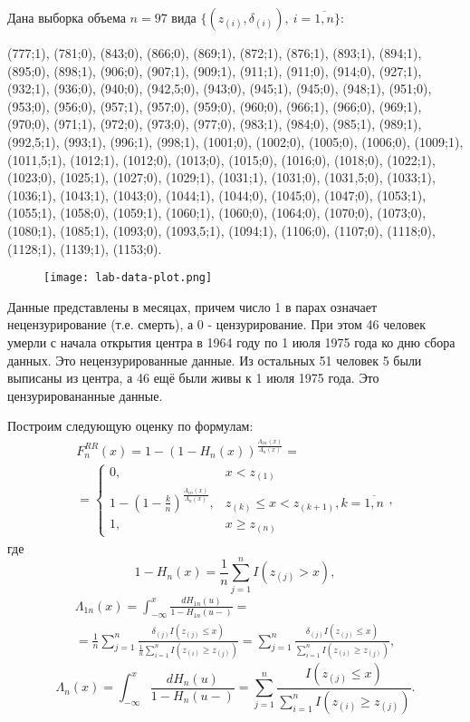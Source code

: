 Дана выборка объема $n = 97$ вида $\{(z_{(i)}, \delta_{(i)}),\ i=\overline{1,n}\}$:

(777;1), (781;0), (843;0), (866;0), (869;1), (872;1), (876;1), (893;1), (894;1), (895;0), (898;1), (906;0), (907;1), (909;1), (911;1), (911;0), (914;0), (927;1), (932;1), (936;0), (940;0), (942,5;0), (943;0), (945;1), (945;0), (948;1), (951;0), (953;0), (956;0), (957;1), (957;0), (959;0), (960;0), (966;1), (966;0), (969;1), (970;0), (971;1), (972;0), (973;0), (977;0), (983;1), (984;0), (985;1), (989;1), (992,5;1), (993;1), (996;1), (998;1), (1001;0), (1002;0), (1005;0), (1006;0), (1009;1), (1011,5;1), (1012;1), (1012;0), (1013;0), (1015;0), (1016;0), (1018;0), (1022;1), (1023;0), (1025;1), (1027;0), (1029;1), (1031;1), (1031;0), (1031,5;0), (1033;1), (1036;1), (1043;1), (1043;0), (1044;1), (1044;0), (1045;0), (1047;0), (1053;1), (1055;1), (1058;0), (1059;1), (1060;1), (1060;0), (1064;0), (1070;0), (1073;0), (1080;1), (1085;1), (1093;0), (1093,5;1), (1094;1), (1106;0), (1107;0), (1118;0), (1128;1), (1139;1), (1153;0).

\begin{figure}[h]
    \begin{center}
        \texttt{[image: lab-data-plot.png]}
        \caption{}
        \label{ris:experimcoded}
    \end{center}
\end{figure}

Данные представлены в месяцах, причем число 1 в парах означает нецензурирование (т.е. смерть), а 0 - цензурирование. При этом 46 человек умерли с начала открытия центра в 1964 году по 1 июля 1975 года ко дню сбора данных. Это нецензурированные данные. Из остальных 51 человек 5 были выписаны из центра, а 46 ещё были живы к 1 июля 1975 года. Это цензурировананные данные.

Построим следующую оценку по формулам:
\begin{multline*}
    F_n^{RR}(x) = 1 - (1 - H_n(x))^{\frac{\Lambda_{1n}(x)}{\Lambda_n(x)}} = \\ = \left\{ \begin{array}{cl} 0, & x < z_{(1)} \\ 1 - (1 - \frac{k}{n})^{\frac{\Lambda_{1n}(x)}{\Lambda_n(x)}}, & z_{(k)} \le x < z_{(k+1)}, k = \overline{1,n} \\ 1, & x \ge z_{(n)} \end{array} \right.,
\end{multline*}
где
\[
    1 - H_n(x) = \frac{1}{n} \sum_{j=1}^n I(z_{(j)} > x),
\]
\begin{multline*}
    \Lambda_{1n}(x) = \int_{-\infty}^x \frac{dH_{1n}(u)}{1 - H_{1n}(u-)} = \\ = \frac{1}{n} \sum_{j=1}^n \frac{\delta_{(j)} I(z_{(j)} \le x)}{\frac{1}{n} \sum_{i=1}^n I(z_{(i)} \ge z_{(j)})} = \sum_{j=1}^n \frac{\delta_{(j)} I(z_{(j)} \le x)}{\sum_{i=1}^n I(z_{(i)} \ge z_{(j)})},
\end{multline*}
\[
    \Lambda_{n}(x) = \int_{-\infty}^x \frac{dH_n(u)}{1 - H_n(u-)} = \sum_{j=1}^n \frac{I(z_{(j)} \le x)}{\sum_{i=1}^n I(z_{(i)} \ge z_{(j)})}.
\]


